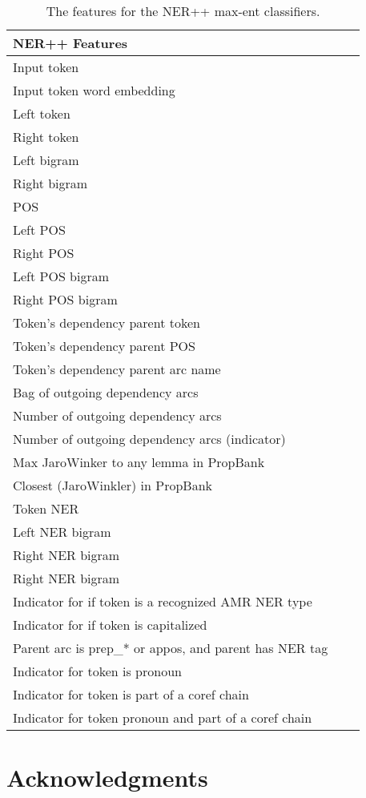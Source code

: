 \documentclass[11pt]{article}
\begin{document}
\begin{table}[h]
\begin{center}
\begin{tabular}{|l|rl|}
\hline \bf NER++ Features \\ \hline
Input token\\
Input token word embedding\\
Left token\\
Right token\\
Left bigram\\
Right bigram\\
POS\\
Left POS\\
Right POS\\
Left POS bigram\\
Right POS bigram\\
Token's dependency parent token\\
Token's dependency parent POS\\
Token's dependency parent arc name\\
Bag of outgoing dependency arcs\\
Number of outgoing dependency arcs\\
Number of outgoing dependency arcs (indicator)\\
Max JaroWinker to any lemma in PropBank\\
Closest (JaroWinkler) in PropBank\\
Token NER\\
Left NER bigram\\
Right NER bigram\\
Right NER bigram\\
Indicator for if token is a recognized AMR NER type\\
Indicator for if token is capitalized\\
Parent arc is prep\_* or appos, and parent has NER tag\\
Indicator for token is pronoun\\
Indicator for token is part of a coref chain\\
Indicator for token pronoun and part of a coref chain\\
\hline
\end{tabular}
\end{center}
\caption{\label{font-table} The features for the NER++ max-ent classifiers. }
\end{table}

\section*{Acknowledgments}
\end{document}
